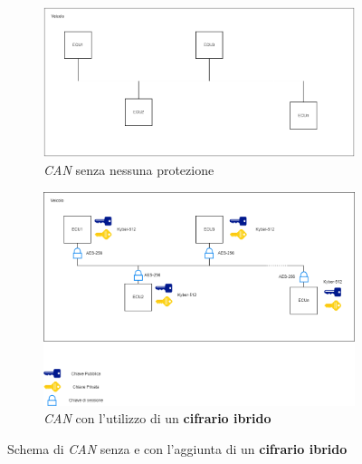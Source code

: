 \begin{figure}[h]
    \begin{subfigure}{0.45\textwidth}
        \includegraphics[width=1\textwidth]{capitoli/figure-soluzione-proposta/can-no-protection.png}
        \vspace{0.7cm}
        \caption{\emph{CAN} senza nessuna protezione}
        \label{fig:can-no-protection}
    \end{subfigure}
    \hfill
    \begin{subfigure}{0.45\textwidth}
        \includegraphics[width=1\textwidth]{capitoli/figure-soluzione-proposta/can-with-protection.png}
        \caption{\emph{CAN} con l'utilizzo di un \textbf{cifrario ibrido}}
        \label{fig:can-with-protection}
    \end{subfigure}
    \caption{Schema di \emph{CAN} senza e con l'aggiunta di un \textbf{cifrario ibrido}}
    \label{fig:can-protection}
\end{figure}

